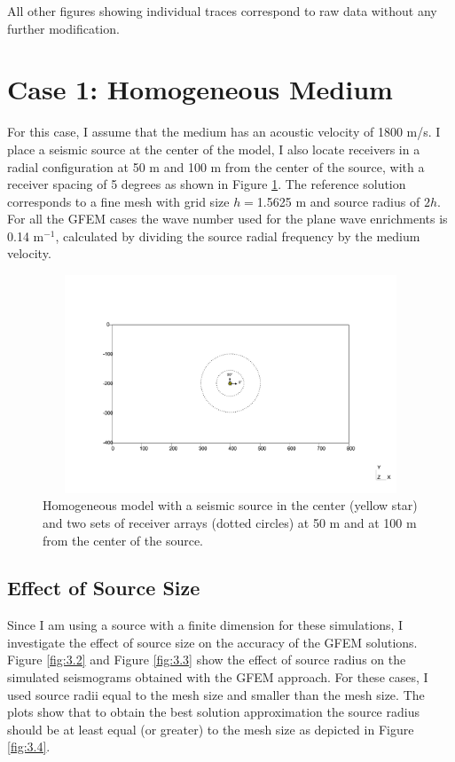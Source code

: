 All other figures showing individual traces correspond to raw data without any further modification.

\section{Case 1: Homogeneous Medium}
For this case, I  assume that the medium has an acoustic velocity of 1800 m/s. I  place a seismic source at the center of the model, I also locate receivers in a radial configuration at 50 m and 100 m from the center of the source, with a receiver spacing of 5 degrees as shown in Figure \ref{fig:3.1}. The reference solution corresponds to a fine mesh with grid size $h=$1.5625 m and source radius of $2h$. For all the GFEM cases the wave number used for the plane wave enrichments is 0.14 m$^{-1}$, calculated by dividing the source radial frequency by the medium velocity.

 \begin{figure}[h!]
	\centering
	\includegraphics[width=12cm, height=6.5cm]{Thesis_Edith/figures/homo/h_source.pdf}
	\caption{Homogeneous model with a seismic source in the center (yellow star) and two sets of receiver arrays (dotted circles) at 50 m and at 100 m from the center of the source.}
	\label{fig:3.1}
\end{figure}

\clearpage
\subsection{Effect of Source Size}
Since I am using a source with a finite dimension for these simulations, I investigate the effect of source size on the accuracy of the GFEM solutions. Figure \ref{fig:3.2} and Figure \ref{fig:3.3} show the effect of source radius on the simulated seismograms obtained with the GFEM approach. For these cases, I used source radii equal to the mesh size and smaller than the mesh size. The plots show that to obtain the best solution approximation the source radius should be at least equal (or greater) to the mesh size as depicted in Figure \ref{fig:3.4}.

